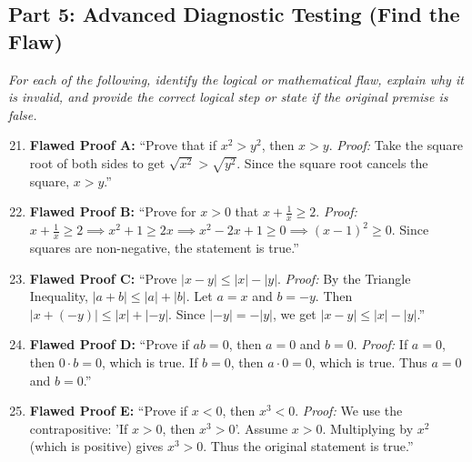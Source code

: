 \documentclass[11pt]{article}
\begin{document}
\subsection{Part 5: Advanced Diagnostic Testing (Find the Flaw)}
\textit{For each of the following, identify the logical or mathematical flaw, explain why it is invalid, and provide the correct logical step or state if the original premise is false.}
\begin{enumerate}
    \setcounter{enumi}{20}
    \item \textbf{Flawed Proof A:} ``Prove that if $x^2 > y^2$, then $x > y$. \textit{Proof:} Take the square root of both sides to get $\sqrt{x^2} > \sqrt{y^2}$. Since the square root cancels the square, $x > y$.''
    \item \textbf{Flawed Proof B:} ``Prove for $x > 0$ that $x + \frac{1}{x} \ge 2$. \textit{Proof:} $x + \frac{1}{x} \ge 2 \implies x^2 + 1 \ge 2x \implies x^2 - 2x + 1 \ge 0 \implies (x-1)^2 \ge 0$. Since squares are non-negative, the statement is true.''
    \item \textbf{Flawed Proof C:} ``Prove $|x - y| \le |x| - |y|$. \textit{Proof:} By the Triangle Inequality, $|a + b| \le |a| + |b|$. Let $a = x$ and $b = -y$. Then $|x + (-y)| \le |x| + |-y|$. Since $|-y| = -|y|$, we get $|x - y| \le |x| - |y|$.''
    \item \textbf{Flawed Proof D:} ``Prove if $ab = 0$, then $a = 0$ and $b = 0$. \textit{Proof:} If $a = 0$, then $0 \cdot b = 0$, which is true. If $b = 0$, then $a \cdot 0 = 0$, which is true. Thus $a = 0$ and $b = 0$.''
    \item \textbf{Flawed Proof E:} ``Prove if $x < 0$, then $x^3 < 0$. \textit{Proof:} We use the contrapositive: 'If $x > 0$, then $x^3 > 0$'. Assume $x > 0$. Multiplying by $x^2$ (which is positive) gives $x^3 > 0$. Thus the original statement is true.''
\end{enumerate}
\end{document}
